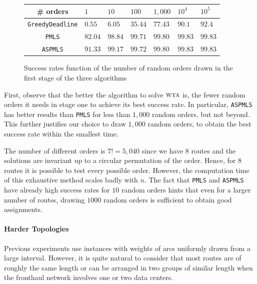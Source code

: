 \documentclass[a4paper,10pt]{journal}
\newcommand\greedydeadline{\texttt{GreedyDeadline}\xspace}
\newcommand\PMLS{\texttt{PMLS}\xspace}
\newcommand\ASPMLS{\texttt{ASPMLS}\xspace}
\newcommand\wta{\textsc{wta}\xspace}
\begin{document}
         \begin{figure}[h] 
       \begin{center}
   \begin{tabularx}{0.8\textwidth}{|c|X|X|X|X|X|X|}
    \hline
    \# orders& $1$ & $10$ & $100$& $1,000$& $10^{4}$&$10^{5}$\\
    \hline
    \greedydeadline & $0.55$ &$6.05$&$35.44$&$77.43$&$90.1$&$92.4$\\
    \hline
    \PMLS & $82.04$ &$98.84$&$99.71$&$99.80$&$99.83$&$99.83$\\
    \hline
    \ASPMLS & $91.33$&$99.17$&$99.72$&$99.80$ &$99.83$&$99.83$\\
    \hline
      \end{tabularx}
      \end{center}
   \caption{Success rates function of the number of random orders drawn in the first stage of the three algorithms}
        \label{fig:randomdrawing}
     \end{figure}

	First, observe that the better the algorithm to solve $\wta$ is, the fewer random orders it needs in stage one to achieve its best success rate. In particular, \ASPMLS has better results than \PMLS for less than $1,000$ random orders, but not beyond. This further justifies our choice to draw $1,000$ random orders, to obtain the best success rate within the smallest time.

	The number of different orders is $7!= 5,040$ since we have $8$ routes and the solutions are invariant up to a circular permutation of the order. Hence, for $8$ routes it is possible to test every possible order. However, the computation time of this exhaustive method scales badly with $n$. The fact that \PMLS and \ASPMLS have already high success rates for $10$ random orders hints that even for a larger number of routes, drawing $1000$ random orders is sufficient to obtain good assignments.


     \paragraph{Harder Topologies}
     
    Previous experiments use instances with weights of arcs uniformly drawn from a large interval. However, it is quite natural to consider that most routes are of roughly the same length or can be arranged in two groups of similar length when the fronthaul network involves one or two data centers.
    
\end{document}
